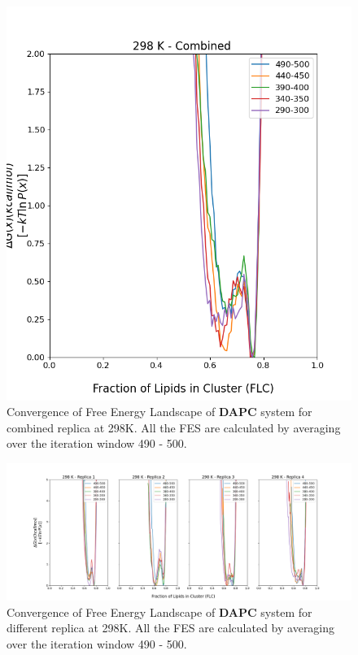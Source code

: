 \documentclass{biophys-new}
\begin{document}
\begin{figure}[hbt!]
\centering
\includegraphics[width=0.6\linewidth]{all_plots/ClusterLipids2Total/DPPC_DAPC_CHOL/298K/Convergence_DAPC_MULTI__298_ClusterLipids2Total.png}
\caption{Convergence of Free Energy Landscape of \textbf{DAPC} system for combined replica at 298K. All the FES are calculated by averaging over the iteration window 490 - 500.}
\label{fig:view}

\end{figure}

\begin{figure}[hbt!]
\centering
\includegraphics[width=1.1\linewidth]{all_plots/ClusterLipids2Total/DPPC_DAPC_CHOL/298K/Convergence_DAPC_298_ClusterLipids2Total.png}
\caption{Convergence of Free Energy Landscape of \textbf{DAPC} system for different replica at 298K. All the FES are calculated by averaging over the iteration window 490 - 500.}
\label{fig:view}

\end{figure}
\end{document}
